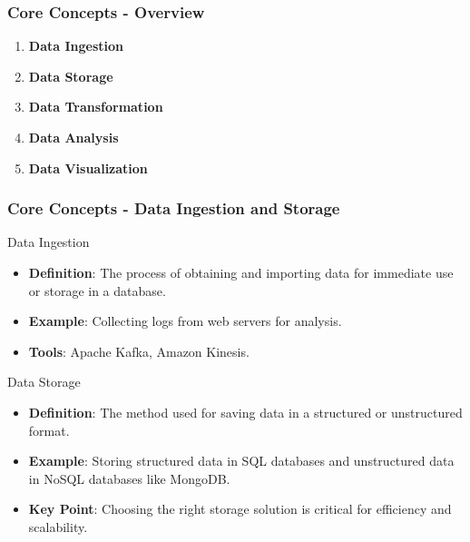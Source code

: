\documentclass[aspectratio=169]{beamer}
\begin{document}
\begin{frame}[fragile]
    \frametitle{Core Concepts - Overview}
    \begin{enumerate}
        \item \textbf{Data Ingestion}
        \item \textbf{Data Storage}
        \item \textbf{Data Transformation}
        \item \textbf{Data Analysis}
        \item \textbf{Data Visualization}
    \end{enumerate}
\end{frame}

\begin{frame}[fragile]
    \frametitle{Core Concepts - Data Ingestion and Storage}
    \begin{block}{Data Ingestion}
        \begin{itemize}
            \item \textbf{Definition}: The process of obtaining and importing data for immediate use or storage in a database.
            \item \textbf{Example}: Collecting logs from web servers for analysis.
            \item \textbf{Tools}: Apache Kafka, Amazon Kinesis.
        \end{itemize}
    \end{block}

    \begin{block}{Data Storage}
        \begin{itemize}
            \item \textbf{Definition}: The method used for saving data in a structured or unstructured format.
            \item \textbf{Example}: Storing structured data in SQL databases and unstructured data in NoSQL databases like MongoDB.
            \item \textbf{Key Point}: Choosing the right storage solution is critical for efficiency and scalability.
        \end{itemize}
    \end{block}
\end{frame}
\end{document}

